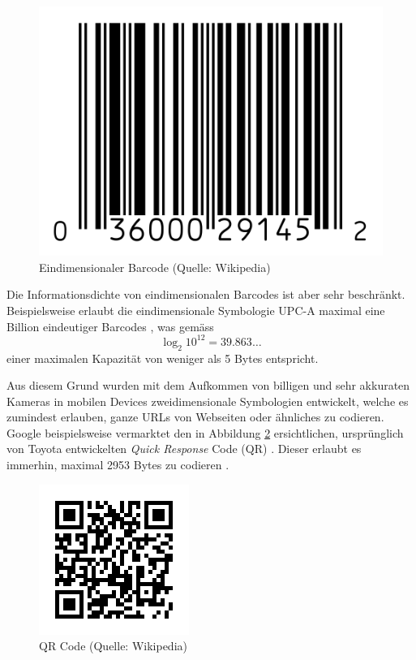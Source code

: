 \documentclass[11pt]{scrreprt} %
\theoremstyle{definition}
\begin{document}
\begin{figure}
\caption{Eindimensionaler Barcode (Quelle: Wikipedia)}
\label{fig:onedbarcode}
\begin{center}
\includegraphics[scale=0.4]{biltli/onedbarcode.png}
\end{center}
\end{figure}

Die Informationsdichte von eindimensionalen Barcodes ist aber sehr beschränkt. Beispielsweise erlaubt die eindimensionale Symbologie UPC-A maximal eine Billion eindeutiger Barcodes \cite{wiki:upc}, was gemäss
\[
\log_2 10^{12} = 39.863\dots
\]
einer maximalen Kapazität von weniger als 5 Bytes entspricht.

Aus diesem Grund wurden mit dem Aufkommen von billigen und sehr akkuraten Kameras in mobilen Devices zweidimensionale Symbologien entwickelt, welche es zumindest erlauben, ganze URLs von Webseiten oder ähnliches zu codieren. Google beispielsweise vermarktet den in Abbildung \ref{fig:qr} ersichtlichen, ursprünglich von Toyota entwickelten {\it Quick Response} Code (QR) \cite{wiki:qr}. Dieser erlaubt es immerhin, maximal 2953 Bytes zu codieren \cite{wiki:qr}.


\begin{figure}
\caption{QR Code (Quelle: Wikipedia)}
\label{fig:qr}
\begin{center}
\includegraphics[scale=0.4]{biltli/qr.png}
\end{center}
\end{figure}
\end{document}
